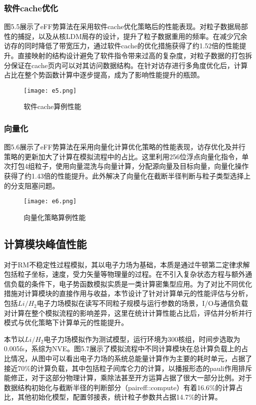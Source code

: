 \subsubsection{软件cache优化}
图5.5展示了eFF势算法在采用软件cache优化策略后的性能表现。对粒子数据局部性的捕捉，以及从核LDM局存的设计，提升了粒子数据重用的频率。在减少冗余访存的同时降低了带宽压力，通过软件cache的优化措施获得了约1.52倍的性能提升。直接映射的结构设计避免了软件指令带来过高的复杂度，对粒子数据的打包拆分保证在cache页内可以对其访问数据结构。在针对访存进行多角度优化后，计算占比在整个势函数计算中逐步提高，成为了影响性能提升的瓶颈。
 \begin{figure}[h]
  \centering
  \texttt{[image: e5.png]}
  \caption{软件cache算例性能}
\end{figure}

\subsubsection{向量化}
图5.6展示了eFF势算法在采用向量化计算优化策略的性能表现，访存优化及并行策略的更新加大了计算在模拟流程中的占比。这里利用256位浮点向量化指令，单次打包4组粒子，使用向量混洗与向量计算，分配源向量及目标向量，向量化操作获得了约1.43倍的性能提升。此外解决了向量化在截断半径判断与粒子类型选择上的分支阻塞问题。
 \begin{figure}[h]
  \centering
  \texttt{[image: e6.png]}
  \caption{向量化策略算例性能}
 \end{figure}

 \subsection{计算模块峰值性能}
 对于RM不稳定性过程模拟，其以电子力场为基础，本质是通过牛顿第二定律求解包括粒子坐标，速度，受力矢量等物理量的过程。在不引入复杂状态方程与额外通信负载的条件下，电子势函数模拟实质是一类计算密集型应用。为了对比不同优化措施对计算模块的直接作用与收益，本节设计了针对计算单元的性能评估与分析，包括$Li/H_2$电子力场模拟在读写不同粒子规模与运行参数的场景，I/O与通信负载对计算在整个模拟流程的影响差异，这里在统计计算性能占比后，评估并分析并行模式与优化策略下计算单元的性能提升。

本节以$Li/H_2$电子力场模拟作为测试模型，运行环境为300核组，时间步选取为0.005fs，系综为NVE。图5.7展示了模拟流程中不同计算模块在总计算负载上的占比情况，从图中可以看出电子力场的系统总能量计算作为主要的耗时单元，占据了接近70\%的计算负载，其中包括粒子间库仑力的计算，以播报形态的pauli作用排斥能修正，对于这部分物理计算，乘除法甚至开方运算占据了很大一部分比例。对于数据结构初始化与截断半径的判断部分（paireff::compute）有着16.6\%的计算占比，其他初始化模型，配置邻接表，统计粒子参数共占据14.7\%的计算。

